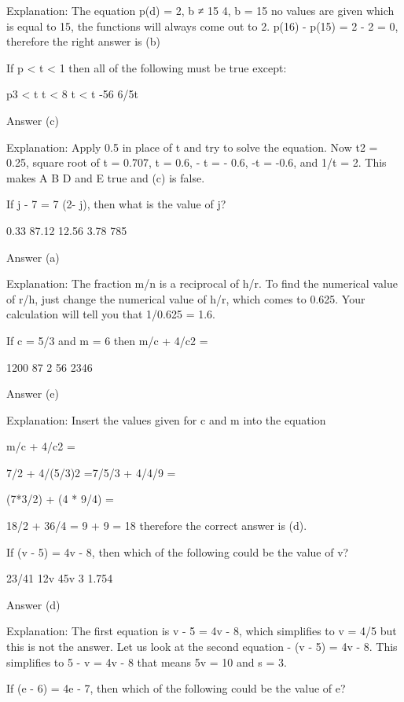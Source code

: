     Explanation: The equation p(d) = {2, b ≠ 15 4, b = 15} no values are given which is equal to 15, the functions will always come out to 2. p(16) - p(15) = 2 - 2 = 0, therefore the right answer is (b)

    If p < t < 1 then all of the following must be true except:

        p3 < t
        t < 8
        t < t
        -56
        6/5t 

    Answer (c)

    Explanation: Apply 0.5 in place of t and try to solve the equation. Now t2 = 0.25, square root of t = 0.707, t = 0.6, - t = - 0.6, -t = -0.6, and 1/t = 2. This makes A B D and E true and (c) is false.

    If j - 7 = 7 (2- j), then what is the value of j?

        0.33
        87.12
        12.56
        3.78
        785 

    Answer (a)

    Explanation: The fraction m/n is a reciprocal of h/r. To find the numerical value of r/h, just change the numerical value of h/r, which comes to 0.625. Your calculation will tell you that 1/0.625 = 1.6. 



    If c = 5/3 and m = 6 then m/c + 4/c2 =

        1200
        87
        2
        56
        2346 

    Answer (e)

    Explanation: Insert the values given for c and m into the equation

    m/c + 4/c2 =

    7/2 + 4/(5/3)2 =7/5/3 + 4/4/9 =

    (7*3/2) + (4 * 9/4) =

    18/2 + 36/4 = 9 + 9 = 18 therefore the correct answer is (d).

    If (v - 5) = 4v - 8, then which of the following could be the value of v?

        23/41
        12v
        45v
        3
        1.754 

    Answer (d)

    Explanation: The first equation is v - 5 = 4v - 8, which simplifies to v = 4/5 but this is not the answer. Let us look at the second equation - (v - 5) = 4v - 8. This simplifies to 5 - v = 4v - 8 that means 5v = 10 and s = 3.

    If (e - 6) = 4e - 7, then which of the following could be the value of e?

